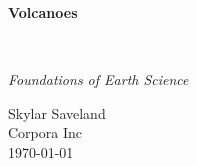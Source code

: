 \clearpage
\vspace*{1.5in}
\begin{center}
  \begin{minipage}{\textwidth}
    \centering
    \Huge\bfseries
    \linespread{1.25}\selectfont
  Volcanoes
  \end{minipage}
  \\[3em]
  {\Large\itshape\linespread{1.3}\selectfont
  Foundations of Earth Science\par}
  \vfill
  {\large Skylar Saveland}
  \\[1em]
  {\large Corpora Inc}
  \\[1em]
  {\large \today}
\end{center}
\clearpage
